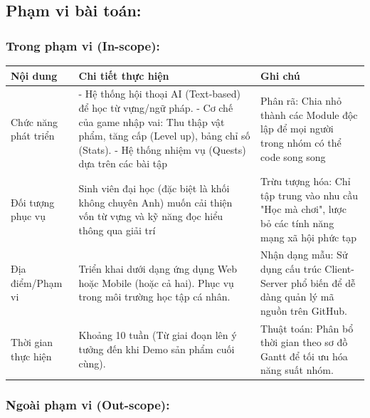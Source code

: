 \subsection{Phạm vi bài toán:}
\subsubsection{Trong phạm vi (In-scope):}

\begin{table}[H]
\centering
\renewcommand{\arraystretch}{1.5}
\begin{tabularx}{\textwidth}{|>{\raggedright\arraybackslash}p{3.5cm}|X|>{\raggedright\arraybackslash}p{4cm}|}
\hline
\textbf{Nội dung} & \textbf{Chi tiết thực hiện} & \textbf{Ghi chú} \\ \hline
Chức năng phát triển & - Hệ thống hội thoại AI (Text-based) để học từ vựng/ngữ pháp. \newline - Cơ chế của game nhập vai: Thu thập vật phẩm, tăng cấp (Level up), bảng chỉ số (Stats). \newline - Hệ thống nhiệm vụ (Quests) dựa trên các bài tập & Phân rã: Chia nhỏ thành các Module độc lập để mọi người trong nhóm có thể code song song \\ \hline
Đối tượng phục vụ & Sinh viên đại học (đặc biệt là khối không chuyên Anh) muốn cải thiện vốn từ vựng và kỹ năng đọc hiểu thông qua giải trí & Trừu tượng hóa: Chỉ tập trung vào nhu cầu "Học mà chơi", lược bỏ các tính năng mạng xã hội phức tạp \\ \hline
Địa điểm/Phạm vi & Triển khai dưới dạng ứng dụng Web hoặc Mobile (hoặc cả hai). Phục vụ trong môi trường học tập cá nhân. & Nhận dạng mẫu: Sử dụng cấu trúc Client-Server phổ biến để dễ dàng quản lý mã nguồn trên GitHub. \\ \hline
Thời gian thực hiện & Khoảng 10 tuần (Từ giai đoạn lên ý tưởng đến khi Demo sản phẩm cuối cùng). & Thuật toán: Phân bổ thời gian theo sơ đồ Gantt để tối ưu hóa năng suất nhóm. \\ \hline
\end{tabularx}
\end{table}

\subsubsection{Ngoài phạm vi (Out-scope):}

